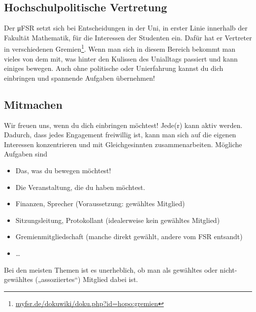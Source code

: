 \documentclass{scrartcl}
\begin{document}
\subsection{Hochschulpolitische Vertretung}
\label{sub:hochschulpolitische_vertretung}
Der μFSR setzt sich bei Entscheidungen in der Uni, in erster Linie innerhalb der Fakultät Mathematik,
für die Interessen der Studenten ein.
Dafür hat er Vertreter in verschiedenen Gremien\footnote{\url{myfsr.de/dokuwiki/doku.php?id=hopo:gremien}}.
Wenn man sich in diesem Bereich  bekommt man vieles von dem mit, was hinter den Kulissen
des Unialltags passiert und kann einiges bewegen.
Auch ohne politische oder Unierfahrung kannst du dich einbringen und spannende Aufgaben übernehmen!

\subsection{Mitmachen}
\label{sub:mitmachen}
Wir freuen uns, wenn du dich einbringen möchtest! Jede(r) kann aktiv werden.
Dadurch, dass jedes Engagement freiwillig ist, kann man sich auf die eigenen Interessen konzentrieren
und mit Gleichgesinnten zusammenarbeiten. Mögliche Aufgaben sind
\begin{itemize}
  \item Das, was du bewegen möchtest!
  \item Die Veranstaltung, die du haben möchtest.
  \item Finanzen, Sprecher (Voraussetzung: gewähltes Mitglied)
  \item Sitzungsleitung, Protokollant (idealerweise kein gewähltes Mitglied)
  \item Gremienmitgliedschaft (manche direkt gewählt, andere vom FSR entsandt)
  \item \dots
\end{itemize}
Bei den meisten Themen ist es unerheblich, ob man als gewähltes oder nicht-gewähltes („assoziiertes“) Mitglied dabei ist.
\end{document}
